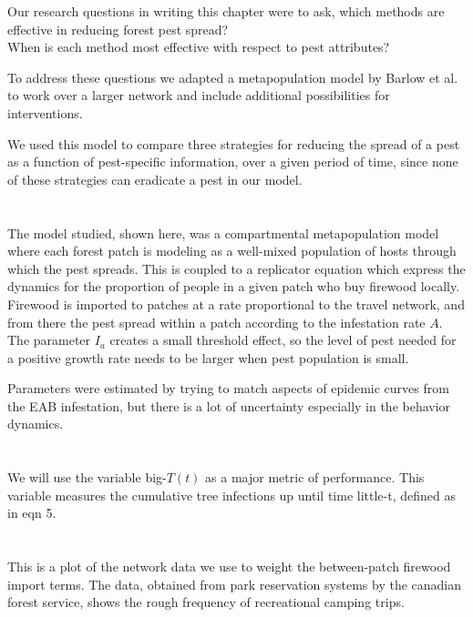 \documentclass{article}
\begin{document}
Our research questions in writing this chapter were to ask, which methods are effective in reducing forest pest spread? \\
\vspace{0.5cm}
When is each method most effective with respect to pest attributes? 

To address these questions we adapted a metapopulation model by Barlow et al. to work over a larger network and include additional possibilities for interventions.

We used this model to compare three strategies for reducing the spread of a pest as a function of pest-specific information, over a given period of time, since none of these strategies can eradicate a pest in our model.


\section{}

The model studied, shown here, was a compartmental metapopulation model where each forest patch is modeling as a well-mixed population of hosts through which the pest spreads. This is coupled to a replicator equation which express the dynamics for the proportion of people in a given patch who buy firewood locally. Firewood is imported to patches at a rate proportional to the travel network, and from there the pest spread within a patch according to the infestation rate $A$. The parameter $I_a$ creates a small threshold effect, so the level of pest needed for a positive growth rate needs to be larger when pest population is small. 

Parameters were estimated by trying to match aspects of epidemic curves from the EAB infestation, but there is a lot of uncertainty especially in the behavior dynamics. 

\section{}

We will use the variable big-$T(t)$ as a major metric of performance. This variable measures the cumulative tree infections up until time little-t, defined as in eqn 5.

\section{}

This is a plot of the network data we use to weight the between-patch firewood import terms. The data, obtained from park reservation systems by the canadian forest service, shows the rough frequency of recreational camping trips.
\end{document}
